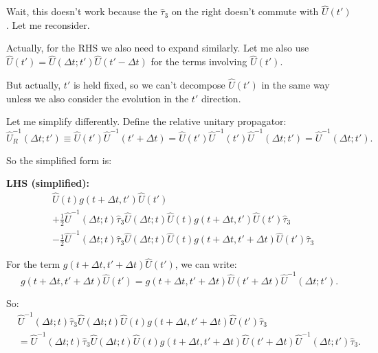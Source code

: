 \documentclass[11pt]{article}
\begin{document}
Wait, this doesn't work because the $\hat{\tau}_3$ on the right doesn't commute with $\hat{U}(t')$. Let me reconsider.

Actually, for the RHS we also need to expand similarly. Let me also use $\hat{U}(t') = \hat{U}(\Delta t; t') \hat{U}(t'-\Delta t)$ for the terms involving $\hat{U}(t')$.

But actually, $t'$ is held fixed, so we can't decompose $\hat{U}(t')$ in the same way unless we also consider the evolution in the $t'$ direction.

Let me simplify differently. Define the relative unitary propagator:
\begin{equation}
\hat{U}_R^{-1}(\Delta t; t') \equiv \hat{U}(t') \hat{U}^{-1}(t'+\Delta t) = \hat{U}(t') \hat{U}^{-1}(t') \hat{U}^{-1}(\Delta t; t') = \hat{U}^{-1}(\Delta t; t').
\end{equation}

So the simplified form is:

\textbf{LHS (simplified):}
\begin{equation}
\boxed{
\begin{split}
&\hat{U}(t) g(t+\Delta t, t') \hat{U}(t') \\
&+ \frac{1}{2} \hat{U}^{-1}(\Delta t; t) \hat{\tau}_3 \hat{U}(\Delta t; t) \hat{U}(t) g(t+\Delta t, t') \hat{U}(t') \hat{\tau}_3 \\
&- \frac{1}{2} \hat{U}^{-1}(\Delta t; t) \hat{\tau}_3 \hat{U}(\Delta t; t) \hat{U}(t) g(t+\Delta t, t'+\Delta t) \hat{U}(t') \hat{\tau}_3
\end{split}
}
\end{equation}

For the term $g(t+\Delta t, t'+\Delta t) \hat{U}(t')$, we can write:
\begin{equation}
g(t+\Delta t, t'+\Delta t) \hat{U}(t') = g(t+\Delta t, t'+\Delta t) \hat{U}(t'+\Delta t) \hat{U}^{-1}(\Delta t; t').
\end{equation}

So:
\begin{equation}
\begin{split}
&\hat{U}^{-1}(\Delta t; t) \hat{\tau}_3 \hat{U}(\Delta t; t) \hat{U}(t) g(t+\Delta t, t'+\Delta t) \hat{U}(t') \hat{\tau}_3 \\
&= \hat{U}^{-1}(\Delta t; t) \hat{\tau}_3 \hat{U}(\Delta t; t) \hat{U}(t) g(t+\Delta t, t'+\Delta t) \hat{U}(t'+\Delta t) \hat{U}^{-1}(\Delta t; t') \hat{\tau}_3.
\end{split}
\end{equation}
\end{document}

